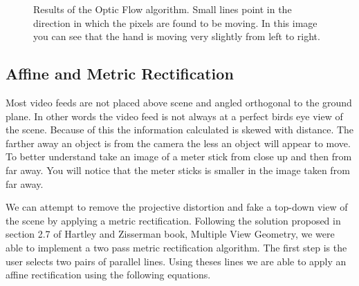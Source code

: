 \documentclass[12pt, onecolumn, conference]{IEEEtran}
\begin{document}
\begin{figure}[!t]
\centering
{}
\hfil
{}
\caption{Results of the Optic Flow algorithm. Small lines point in the direction in which the pixels are found to be moving. In this image you can see that the hand is moving very slightly from left to right.}
\label{Optic_Flow}
\end{figure}

\subsection{Affine and Metric Rectification}

Most video feeds are not placed above scene and angled orthogonal to the ground plane. In other words the video feed is not always at a perfect birds eye view of the scene. Because of this the information calculated is skewed with distance. The farther away an object is from the camera the less an object will appear to move. To better understand take an image of a meter stick from close up and then from far away. You will notice that the meter sticks is smaller in the image taken from far away. 

We can attempt to remove the projective distortion and fake a top-down view of the scene by applying a metric rectification. Following the solution proposed in section 2.7 of Hartley and Zisserman book, Multiple View Geometry, we were able to implement a two pass metric rectification algorithm. The first step is the user selects two pairs of parallel lines. Using theses lines we are able to apply an affine rectification using the following equations.
\end{document}
